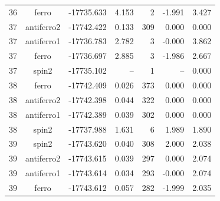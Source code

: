 \begin{longtable}{@{}ccrrrrr@{}}
36 & ferro & -17735.633 & 4.153 & 2 & -1.991 & 3.427 \\
\rowcolor{gray!20} 37 & antiferro2 & -17742.422 & 0.133 & 309 & 0.000 & 0.000 \\
37 & antiferro1 & -17736.783 & 2.782 & 3 & -0.000 & 3.862 \\
37 & ferro & -17736.697 & 2.885 & 3 & -1.986 & 2.667 \\
37 & spin2 & -17735.102 & -- & 1 & -- & 0.000 \\
\rowcolor{gray!20} 38 & ferro & -17742.409 & 0.026 & 373 & 0.000 & 0.000 \\
38 & antiferro2 & -17742.398 & 0.044 & 322 & 0.000 & 0.000 \\
38 & antiferro1 & -17742.389 & 0.039 & 302 & 0.000 & 0.000 \\
38 & spin2 & -17737.988 & 1.631 & 6 & 1.989 & 1.890 \\
\rowcolor{gray!20} 39 & spin2 & -17743.620 & 0.040 & 308 & 2.000 & 2.038 \\
39 & antiferro2 & -17743.615 & 0.039 & 297 & 0.000 & 2.074 \\
39 & antiferro1 & -17743.614 & 0.034 & 293 & -0.000 & 2.074 \\
39 & ferro & -17743.612 & 0.057 & 282 & -1.999 & 2.035 \\
\end{longtable}